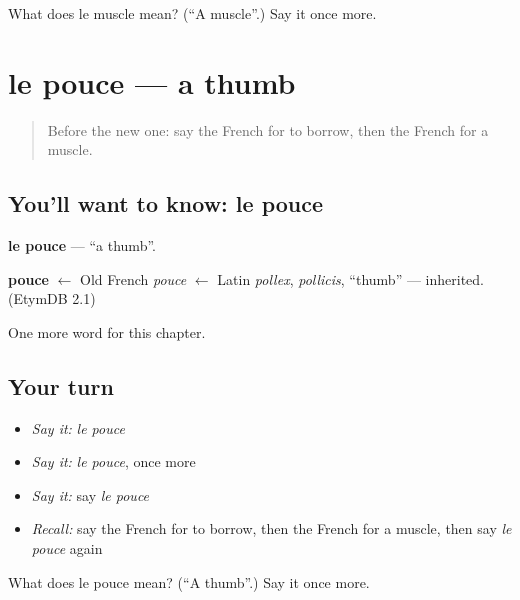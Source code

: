 \begin{tcolorbox}[breakable,colback=teal!4,colframe=teal!35!black,title={Before you move on}]
What does le muscle mean? (\textquotedblleft{}A muscle\textquotedblright{}.) Say it once more.
\end{tcolorbox}
\section[le pouce]{le pouce — a thumb}

\label{lesson:FR-C185-pouce}



\begin{quote}
Before the new one: say the French for to borrow, then the French for a muscle.
\end{quote}

\subsection*{You'll want to know: le pouce}
\textbf{le pouce} — \textquotedblleft{}a thumb\textquotedblright{}.

\begin{cousinweb}
\textbf{pouce} $\leftarrow$ Old French \emph{pouce} $\leftarrow$ Latin \emph{pollex}, \emph{pollicis}, \textquotedblleft{}thumb\textquotedblright{} — inherited. (EtymDB 2.1)
\end{cousinweb}

\begin{grammarlens}[title={What you've built}]
One more word for this chapter.
\end{grammarlens}

\subsection*{Your turn}
\begin{itemize}
\raggedright
  \item \emph{Say it:} \emph{le pouce}
  \item \emph{Say it:} \emph{le pouce}, once more
  \item \emph{Say it:} say \emph{le pouce}
  \item \emph{Recall:} say the French for to borrow, then the French for a muscle, then say \emph{le pouce} again
\end{itemize}

\begin{tcolorbox}[breakable,colback=teal!4,colframe=teal!35!black,title={Before you move on}]
What does le pouce mean? (\textquotedblleft{}A thumb\textquotedblright{}.) Say it once more.
\end{tcolorbox}
